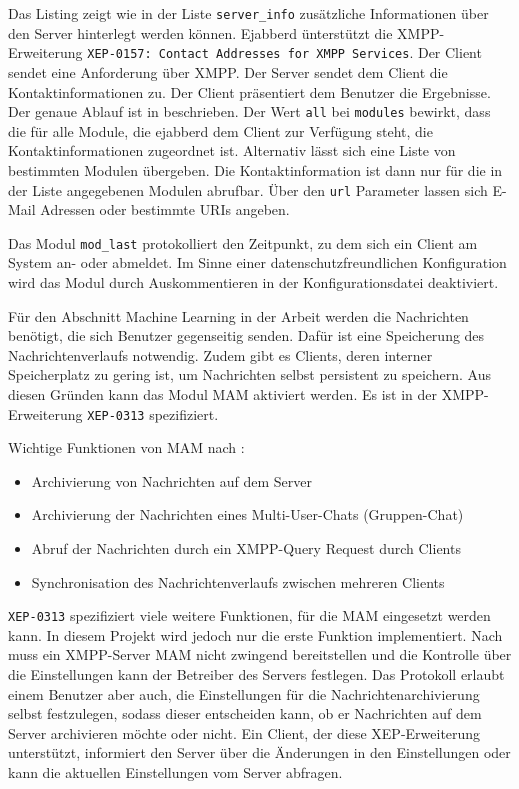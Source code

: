 \documentclass[a4paper,titlepage,halfparskip,12pt]{scrreprt}
\begin{document}
\begin{onehalfspacing}
Das Listing zeigt wie in der Liste \texttt{server\_info} zusätzliche Informationen über den Server hinterlegt werden können. Ejabberd ünterstützt die \ac{XMPP}-Erweiterung \texttt{XEP-0157: Contact Addresses for XMPP Services}. Der Client sendet eine Anforderung über \ac{XMPP}. Der Server sendet dem Client die Kontaktinformationen zu. Der Client präsentiert dem Benutzer die Ergebnisse. Der genaue Ablauf ist in  \cite{xepContactInformation} beschrieben. Der Wert \texttt{all} bei \texttt{modules} bewirkt, dass die für alle Module, die ejabberd dem Client zur Verfügung steht, die Kontaktinformationen zugeordnet ist. Alternativ lässt sich eine Liste von bestimmten Modulen übergeben. Die Kontaktinformation ist dann nur für die in der Liste angegebenen Modulen abrufbar. Über den \texttt{url} Parameter lassen sich E-Mail Adressen oder bestimmte \ac{URI}s angeben.

Das Modul \texttt{mod\_last} protokolliert den Zeitpunkt, zu dem sich ein Client am System an- oder abmeldet. Im Sinne einer datenschutzfreundlichen Konfiguration wird das Modul durch Auskommentieren in der Konfigurationsdatei deaktiviert.

Für den Abschnitt Machine Learning in der Arbeit werden die Nachrichten benötigt, die sich Benutzer gegenseitig senden. Dafür ist eine Speicherung des Nachrichtenverlaufs notwendig. Zudem gibt es Clients, deren interner Speicherplatz zu gering ist, um Nachrichten selbst persistent zu speichern. Aus diesen Gründen kann das Modul \ac{MAM} aktiviert werden. Es ist in der \ac{XMPP}-Erweiterung \texttt{XEP-0313} spezifiziert.\cite{xepMAM}

Wichtige Funktionen von \ac{MAM} nach \cite{xepMAM}:

\begin{itemize}
\item Archivierung von Nachrichten auf dem Server
\item Archivierung der Nachrichten eines Multi-User-Chats (Gruppen-Chat)
\item Abruf der Nachrichten durch ein \ac{XMPP}-Query Request durch Clients
\item Synchronisation des Nachrichtenverlaufs zwischen mehreren Clients
\end{itemize}

\texttt{XEP-0313} spezifiziert viele weitere Funktionen, für die \ac{MAM} eingesetzt werden kann. In diesem Projekt wird jedoch nur die erste Funktion implementiert. Nach \cite{xepMAM} muss ein \ac{XMPP}-Server \ac{MAM} nicht zwingend bereitstellen und die Kontrolle über die Einstellungen kann der Betreiber des Servers festlegen. Das Protokoll erlaubt einem Benutzer aber auch, die Einstellungen für die Nachrichtenarchivierung selbst festzulegen, sodass dieser entscheiden kann, ob er Nachrichten auf dem Server archivieren möchte oder nicht. Ein Client, der diese XEP-Erweiterung unterstützt, informiert den Server über die Änderungen in den Einstellungen oder kann die aktuellen Einstellungen vom Server abfragen.\cite{xepMAM}


\end{onehalfspacing}
\end{document}
